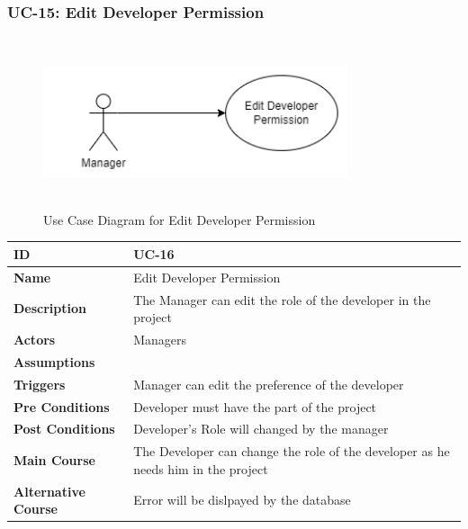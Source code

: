     \subsubsection{UC-15: Edit Developer Permission}
    \begin{figure}[H]
        \includegraphics[height=5cm, width=0.8\textwidth]{./diagrams/Use Case/u15.png}
        \centering 
        \caption{Use Case Diagram for Edit Developer Permission}
        \label{fig:Usecase1}
        \end{figure}
        
    \begin{center}
        \begin{tabularx}{\textwidth}{|l|X|}
            \hline
            \textbf{ID} & UC-16 \\
            \hline
            \textbf{Name} & Edit Developer Permission \\
            \hline
            \textbf{Description} & The Manager can edit the role of the developer in the project \\
            \hline
            \textbf{Actors} & Managers \\
            \hline
            \textbf{Assumptions} &  \\
            \hline
            \textbf{Triggers} & Manager can edit the preference of the developer \\
            \hline
            \textbf{Pre Conditions} & Developer must have the part of the project \\
            \hline
            \textbf{Post Conditions} & Developer's Role will changed by the manager \\
            \hline
            \textbf{Main Course} & The Developer can change the role of the developer as he needs him in the project \\
            \hline
            \textbf{Alternative Course} & Error will be dislpayed by the database \\
            \hline
            
        \end{tabularx}
    \end{center}
    \newpage
    

